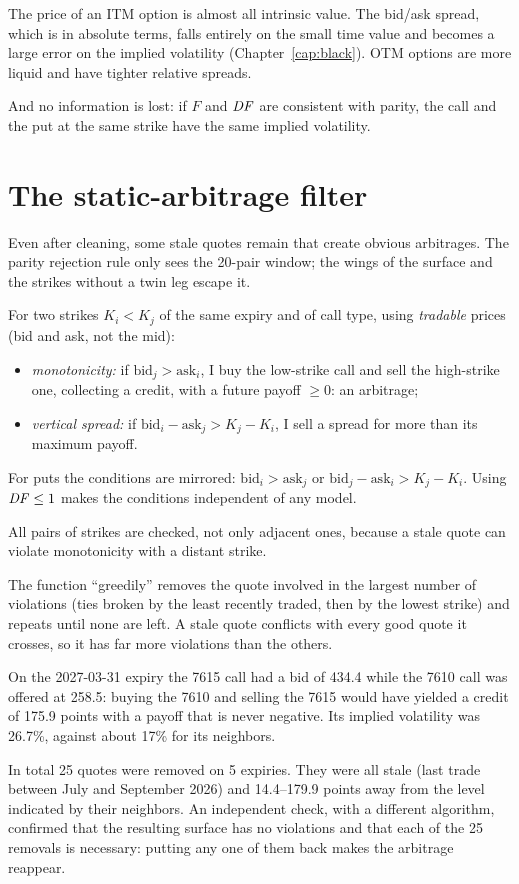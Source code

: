 \begin{perche}
The price of an ITM option is almost all intrinsic value. The bid/ask spread, which is in absolute terms, falls
entirely on the small time value and becomes a large error on the implied volatility (Chapter~\ref{cap:black}). OTM
options are more liquid and have tighter relative spreads.

And no information is lost: if $F$ and $\mathit{DF}$ are consistent with parity, the call and the put at the same strike have
the same implied volatility.
\end{perche}

\section{The static-arbitrage filter}
\label{sec:filtro-arbitraggio}
Even after cleaning, some stale quotes remain that create obvious arbitrages. The parity rejection rule only sees the
20-pair window; the wings of the surface and the strikes without a twin leg escape it.

For two strikes $K_i<K_j$ of the same expiry and of call type, using \emph{tradable} prices (bid and ask, not the
mid):
\begin{itemize}
\item \emph{monotonicity:} if $\text{bid}_j>\text{ask}_i$, I buy the low-strike call and sell the high-strike one,
collecting a credit, with a future payoff $\ge0$: an arbitrage;
\item \emph{vertical spread:} if $\text{bid}_i-\text{ask}_j>K_j-K_i$, I sell a spread for more than its maximum
payoff.
\end{itemize}
For puts the conditions are mirrored: $\text{bid}_i>\text{ask}_j$ or $\text{bid}_j-\text{ask}_i>K_j-K_i$. Using
$\mathit{DF}\le1$ makes the conditions independent of any model.

All pairs of strikes are checked, not only adjacent ones, because a stale quote can violate monotonicity with a
distant strike.

The function  ``greedily'' removes the quote involved in the largest number of
violations (ties broken by the least recently traded, then by the lowest strike) and repeats until none are left. A
stale quote conflicts with every good quote it crosses, so it has far more violations than the others.

\begin{esempio}
On the \mbox{2027-03-31} expiry the 7615 call had a bid of 434.4 while the 7610 call was offered at 258.5: buying the
7610 and selling the 7615 would have yielded a credit of 175.9 points with a payoff that is never negative. Its
implied volatility was 26.7\%, against about 17\% for its neighbors.

In total 25 quotes were removed on 5 expiries. They were all stale (last trade between July and September 2026) and
14.4--179.9 points away from the level indicated by their neighbors. An independent check, with a different
algorithm, confirmed that the resulting surface has no violations and that each of the 25 removals is necessary:
putting any one of them back makes the arbitrage reappear.
\end{esempio}

